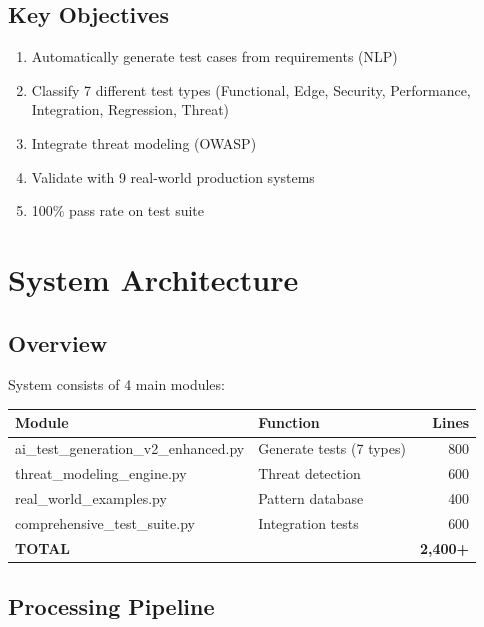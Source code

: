 \documentclass[12pt,a4paper]{report}
\begin{document}
\section{Key Objectives}

\begin{enumerate}
    \item Automatically generate test cases from requirements (NLP)
    \item Classify 7 different test types (Functional, Edge, Security, Performance, Integration, Regression, Threat)
    \item Integrate threat modeling (OWASP)
    \item Validate with 9 real-world production systems
    \item 100\% pass rate on test suite
\end{enumerate}

\chapter{System Architecture}

\section{Overview}

System consists of 4 main modules:

\begin{table}[h]
\centering
\begin{tabular}{|l|p{8cm}|r|}
\hline
\textbf{Module} & \textbf{Function} & \textbf{Lines} \\
\hline
ai\_test\_generation\_v2\_enhanced.py & Generate tests (7 types) & 800 \\
\hline
threat\_modeling\_engine.py & Threat detection & 600 \\
\hline
real\_world\_examples.py & Pattern database & 400 \\
\hline
comprehensive\_test\_suite.py & Integration tests & 600 \\
\hline
\textbf{TOTAL} & & \textbf{2,400+} \\
\hline
\end{tabular}
\end{table}

\section{Processing Pipeline}
\end{document}
